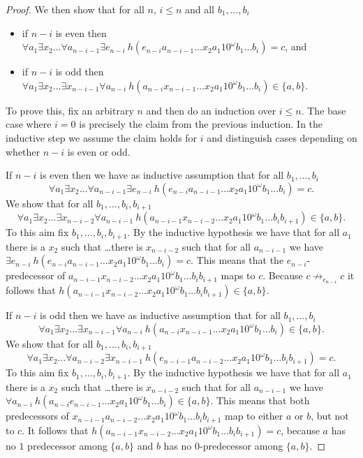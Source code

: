 \documentclass[a4paper]{article}
\begin{document}
\begin{proof}
We then show that for all $n$, $i \leq n$ and all $b_1,\dots,b_i$
\begin{itemize}
 \item if $n - i$ is even then $\forall a_1 \exists x_2 \dots \forall
a_{n - i - 1} \exists e_{n - i} \  h(e_{n - i} a_{n - i - 1} \dots x_2
a_1 1 0^\omega b_1 \dots b_i) = c$, and
 \item if $n - i$ is odd then $\forall a_1 \exists x_2
\dots \exists x_{n - i - 1} \forall a_{n - i} \
h(a_{n - i} x_{n - i - 1} \dots
x_2 a_1 1 0^\omega b_1 \dots b_i) \in \{a,b\}$.
\end{itemize}
To prove this, fix an arbitrary $n$ and then do an induction over $i
\leq n$. The base case where $i = 0$ is precisely the claim from the
previous induction. In the inductive step we assume the claim holds for
$i$ and distinguish cases depending on whether $n - i$ is even or odd.

If $n - i$ is even then we have as inductive assumption that for all
$b_1,\dots,b_i$
\[
 \forall a_1 \exists x_2 \dots \forall a_{n - i - 1} \exists e_{n - i} \
h(e_{n - i} a_{n - i - 1} \dots x_2 a_1 1 0^\omega b_1 \dots b_i) = c.
\]
We show that for all $b_1,\dots,b_i,b_{i + 1}$
\[
 \forall a_1 \exists x_2 \dots \exists x_{n - i - 2} \forall a_{n - i -
1} \ h(a_{n - i - 1} x_{n - i - 2} \dots x_2 a_1 1 0^\omega b_1 \dots
b_i b_{i + 1}) \in \{a,b\}.
\]
To this aim fix $b_1,\dots,b_i,b_{i + 1}$. By the inductive hypothesis
we have that for all $a_1$ there is a $x_2$ such that \dots there is
$x_{n - i - 2}$ such that for all $a_{n - i - 1}$ we have $\exists e_{n
- i} \ h(e_{n - i} a_{n - i - 1} \dots x_2 a_1 1 0^\omega b_1 \dots b_i)
  = c$. This means that the $e_{n - i}$-predecessor of $a_{n - i - 1}
x_{n - i - 2} \dots x_2 a_1 1 0^\omega b_1 \dots b_i b_{i + 1}$ maps to
$c$. Because $c \not \rightarrow_{e_{n - i}} c$ it follows that $h(a_{n
- i - 1} x_{n - i - 2} \dots x_2 a_1 1 0^\omega b_1 \dots b_i b_{i + 1})
\in \{a,b\}$.

If $n - i$ is odd then we have as inductive assumption that for all
$b_1,\dots,b_i$
\[
 \forall a_1 \exists x_2
\dots \exists x_{n - i - 1} \forall a_{n - i} \
h(a_{n - i} x_{n - i - 1} \dots
x_2 a_1 1 0^\omega b_1 \dots b_i) \in \{a,b\}.
\]
We show that for all $b_1,\dots,b_i,b_{i + 1}$
\[
 \forall a_1 \exists x_2 \dots \forall a_{n - i - 2} \exists x_{n - i -
1} \ h(e_{n - i - 1} a_{n - i - 2} \dots x_2 a_1 1 0^\omega b_1 \dots
b_i b_{i + 1}) = c.
\]
To this aim fix $b_1,\dots,b_i,b_{i + 1}$. By the inductive hypothesis
we have that for all $a_1$ there is a $x_2$ such that \dots there is
$x_{n - i - 2}$ such that for all $a_{n - i - 1}$ we have $\forall a_{n
- i} \ h(a_{n - i} e_{n - i - 1} \dots x_2 a_1 1 0^\omega b_1 \dots b_i)
  \in \{a,b\}$. This means that both predecessors of $x_{n - i - 1} a_{n
- i - 2} \dots x_2 a_1 1 0^\omega b_1 \dots b_i b_{i + 1}$ map to either
$a$ or $b$, but not to $c$. It follows that $h(a_{n - i - 1} x_{n - i -
2} \dots x_2 a_1 1 0^\omega b_1 \dots b_i b_{i + 1}) = c$, because $a$
has no $1$ predecessor among $\{a,b\}$ and $b$ has no $0$-predecessor
among $\{a, b\}$.


\end{proof}
\end{document}
